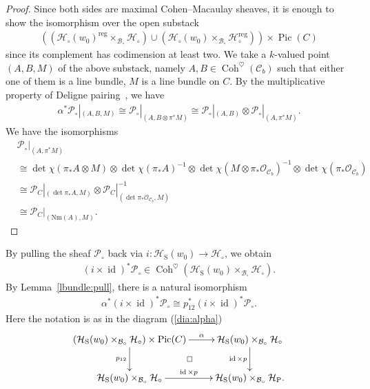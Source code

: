 \documentclass[11pt,oneside,a4paper,mathscr]{amsart}
\makeatletter
\theoremstyle{definition}
\newcommand{\Pic}{\operatorname{Pic}}
\newcommand{\cH}{\mathcal{H}}
\newcommand{\cB}{\mathcal{B}}
\newcommand{\cC}{\mathcal{C}}
\newcommand{\cP}{\mathcal{P}}
\newcommand{\diasquare}{\ar@{}[rd]|\square}
\newcommand{\Coh}{\operatorname{Coh}}
\newcommand{\id}{\operatorname{id}}
\newcommand{\rS}{\mathrm{S}}
\newcommand{\rP}{\mathrm{P}}
\makeatother
\begin{document}
\begin{proof}
   Since both sides are maximal Cohen--Macaulay sheaves, it is enough 
   to show the isomorphism over the open substack 
   \begin{align*}((\cH_{\circ}(w_0)^{\mathrm{reg}}\times_{\cB_{\circ}}\cH_{\circ})
   \cup (\cH_{\circ}(w_0)\times_{\cB_{\circ}}\cH_{\circ}^{\mathrm{reg}}))\times \Pic(C)
   \end{align*}
   since its complement has codimension at least two. 
We take a $k$-valued point $(A, B, M)$ of the above substack, namely $A, B \in \Coh^{\heartsuit}(\cC_b)$ such that either one of them is a line bundle, $M$ is a line bundle on $C$.
   By the multiplicative property of Deligne pairing~\cite[Section~6.2]{Deligne1987Determinant}, we have 
   \begin{align*}
       \alpha^* \cP_{\circ}|_{(A, B, M)} \cong 
       \cP_{\circ}|_{(A, B\otimes \pi^* M)} 
       \cong \cP_{\circ}|_{(A, B)}\otimes \cP_{\circ}|_{(A, \pi^*M)}.
   \end{align*}
   We have the isomorphisms
   \begin{align*}
    &\cP_{\circ}|_{(A, \pi^*M)} \\
    &\cong   
    \det \chi(\pi_{*}A\otimes M)\otimes \det \chi(\pi_{*}A)^{-1}\otimes \det \chi(M\otimes \pi_{*}\mathcal{O}_{\cC_b})^{-1}\otimes 
    \det \chi(\pi_{*}\mathcal{O}_{\cC_b}) \\
    &\cong \cP_C|_{(\det \pi_{*}A, M)}\otimes \cP_{C}|_{(\det \pi_{*}\mathcal{O}_{\cC_b}, M)}^{-1} \\
    &\cong \cP_{C}|_{(\mathrm{Nm}(A), M)}.
   \end{align*}
\end{proof}

By pulling the sheaf $\cP_{\circ}$ back via
$i \colon\cH_{\rS}(w_0) \to \cH_{\circ}$, we obtain 
\begin{align*}
   (i\times \id)^* \cP_{\circ}\in \Coh^{\heartsuit}(\cH_{\rS}(w_0)\times_{\cB_{\circ}}\cH_{\circ}).
\end{align*}
By Lemma~\ref{lbundle:pull},
there is a natural isomorphism 
\begin{align}\label{isom:Palpha}
    \alpha^* (i\times \id)^* \cP_{\circ} \cong p_{12}^* (i\times \id)^* \cP_{\circ}.
\end{align}
Here the notation is as in the diagram (\ref{dia:alpha})
\begin{align*}
    \xymatrix{(\cH_{\rS}(w_0)\times_{\cB_{\circ}}\cH_{\circ}) \times \Pic(C) \ar[r]^-{\alpha} \ar[d]_-{p_{12}} \diasquare
    & \cH_{\rS}(w_0)\times_{\cB_{\circ}}\cH_{\circ} \ar[d]_-{\id\times p} \\
    \cH_{\rS}(w_0)\times_{\cB_{\circ}}\cH_{\circ} \ar[r]^-{\id \times p} & \cH_{\rS}(w_0)\times_{\cB_{\circ}}\cH_{\rP}.
    }
\end{align*}
\end{document}
